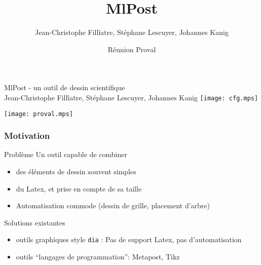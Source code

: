 \documentclass[nodefaultblocks]{beamer}
\title{MlPost}
\author{Jean-Christophe Fillîatre, Stéphane Lescuyer, Johannes Kanig}
\institute{Proval}
\date{Réunion Proval}
\begin{document}
\begin{frame}
  
  \begin{center}
    {\huge{MlPost - un outil de dessin scientifique}}\\[2em]
    {\large \alert{Jean-Christophe Fill\^iatre, St\'ephane Lescuyer, Johannes
    Kanig}}
    \medskip
    \hfill\texttt{[image: cfg.mps]}
  \end{center}
  \hfill\texttt{[image: proval.mps]}
\end{frame}

\begin{frame}\frametitle{Motivation}

  \begin{block}{Problème}
    Un outil capable de combiner
    \begin{itemize}
      \item des éléments de dessin souvent simples
      \item du Latex, et prise en compte de sa taille
      \item Automatisation commode (dessin de grille, placement d'arbre)
    \end{itemize}
  \end{block}

  \begin{block}{Solutions existantes}
    \begin{itemize}
      \item outils graphiques style {\tt dia} : Pas de support Latex, pas
        d'automatisation
      \item outils ``langages de programmation'': Metapost, Tikz
    \end{itemize}
  \end{block}
  
\end{frame}
\end{document}
